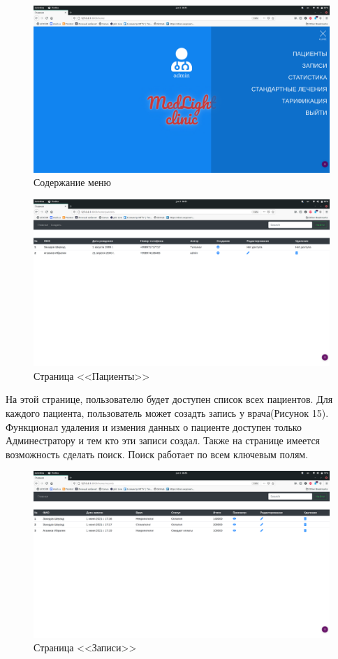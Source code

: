 \documentclass[a4paper, 10pt]{article}
\begin{document}
 	\clearpage
 	\newpage
 		\begin{figure}[h!]
 			\centering
 			\includegraphics[scale=0.12]{menu}
 			\centering\caption{Содержание меню}
 		\end{figure}
 	\begin{figure}[h!]
 		\centering
 		\includegraphics[scale=0.12]{patients}
 		\centering\caption{Страница <<Пациенты>>}
 	\end{figure}
 	\hspace*{5mm} На этой странице, пользователю будет доступен список всех пациентов. Для каждого пациента, пользователь может созадть запись у врача(Рисунок 15). Функционал удаления и измения данных о пациенте доступен только Админестратору и тем кто эти записи создал. Также на странице имеется возможность сделать поиск. Поиск работает по всем ключевым полям.
 	\clearpage
 	\newpage
 	\begin{figure}[h!]
 		\centering
 		\includegraphics[scale=0.12]{records}
 		\centering\caption{Страница <<Записи>>}
 	\end{figure} 
\end{document}
